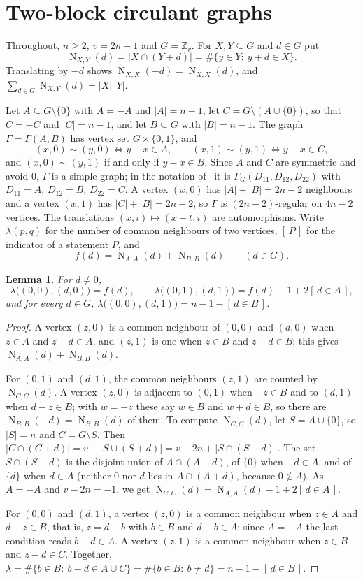 \documentclass[11pt]{amsart}
\newtheorem{lemma}[theorem]{Lemma}
\theoremstyle{definition}
\theoremstyle{remark}
\numberwithin{equation}{section}
\newcommand{\Z}{\mathbb{Z}}
\newcommand{\NN}{\operatorname{N}}
\newcommand{\ind}[1]{[\,#1\,]}
\begin{document}
\section{Two-block circulant graphs}\label{sec:blocks}

Throughout, $n\ge2$, $v=2n-1$ and $G=\Z_v$. For $X,Y\subseteq G$ and $d\in G$ put
\[
\NN_{X,Y}(d)=|X\cap(Y+d)|=\#\{y\in Y:\ y+d\in X\}.
\]
Translating by $-d$ shows $\NN_{X,X}(-d)=\NN_{X,X}(d)$, and $\sum_{d\in G}\NN_{X,Y}(d)=|X|\,|Y|$.

Let $A\subseteq G\setminus\{0\}$ with $A=-A$ and $|A|=n-1$, let $C=G\setminus(A\cup\{0\})$, so that $C=-C$ and $|C|=n-1$, and let $B\subseteq G$ with $|B|=n-1$. The graph $\Gamma=\Gamma(A,B)$ has vertex set $G\times\{0,1\}$, and
\[
(x,0)\sim(y,0)\iff y-x\in A,\qquad (x,1)\sim(y,1)\iff y-x\in C,
\]
and $(x,0)\sim(y,1)$ if and only if $y-x\in B$.
Since $A$ and $C$ are symmetric and avoid $0$, $\Gamma$ is a simple graph; in the notation of~\cite{We} it is $\Gamma_G(D_{11},D_{12},D_{22})$ with $D_{11}=A$, $D_{12}=B$, $D_{22}=C$. A vertex $(x,0)$ has $|A|+|B|=2n-2$ neighbours and a vertex $(x,1)$ has $|C|+|B|=2n-2$, so $\Gamma$ is $(2n-2)$-regular on $4n-2$ vertices. The translations $(x,i)\mapsto(x+t,i)$ are automorphisms. Write $\lambda(p,q)$ for the number of common neighbours of two vertices, $\ind{P}$ for the indicator of a statement $P$, and
\[
f(d)=\NN_{A,A}(d)+\NN_{B,B}(d)\qquad(d\in G).
\]

\begin{lemma}\label{lem:lambda}
For $d\ne0$,
\[
\lambda\big((0,0),(d,0)\big)=f(d),\qquad \lambda\big((0,1),(d,1)\big)=f(d)-1+2\ind{d\in A},
\]
and for every $d\in G$, $\lambda\big((0,0),(d,1)\big)=n-1-\ind{d\in B}$.
\end{lemma}

\begin{proof}
A vertex $(z,0)$ is a common neighbour of $(0,0)$ and $(d,0)$ when $z\in A$ and $z-d\in A$, and $(z,1)$ is one when $z\in B$ and $z-d\in B$; this gives $\NN_{A,A}(d)+\NN_{B,B}(d)$.

For $(0,1)$ and $(d,1)$, the common neighbours $(z,1)$ are counted by $\NN_{C,C}(d)$. A vertex $(z,0)$ is adjacent to $(0,1)$ when $-z\in B$ and to $(d,1)$ when $d-z\in B$; with $w=-z$ these say $w\in B$ and $w+d\in B$, so there are $\NN_{B,B}(-d)=\NN_{B,B}(d)$ of them. To compute $\NN_{C,C}(d)$, let $S=A\cup\{0\}$, so $|S|=n$ and $C=G\setminus S$. Then $|C\cap(C+d)|=v-|S\cup(S+d)|=v-2n+|S\cap(S+d)|$. The set $S\cap(S+d)$ is the disjoint union of $A\cap(A+d)$, of $\{0\}$ when $-d\in A$, and of $\{d\}$ when $d\in A$ (neither $0$ nor $d$ lies in $A\cap(A+d)$, because $0\notin A$). As $A=-A$ and $v-2n=-1$, we get $\NN_{C,C}(d)=\NN_{A,A}(d)-1+2\ind{d\in A}$.

For $(0,0)$ and $(d,1)$, a vertex $(z,0)$ is a common neighbour when $z\in A$ and $d-z\in B$, that is, $z=d-b$ with $b\in B$ and $d-b\in A$; since $A=-A$ the last condition reads $b-d\in A$. A vertex $(z,1)$ is a common neighbour when $z\in B$ and $z-d\in C$. Together, $\lambda=\#\{b\in B:\ b-d\in A\cup C\}=\#\{b\in B:\ b\ne d\}=n-1-\ind{d\in B}$.
\end{proof}
\end{document}
